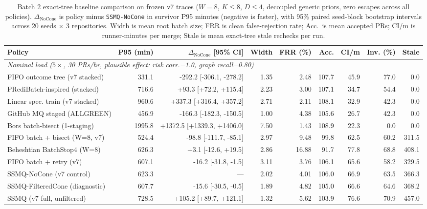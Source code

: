 \begin{table}[t]\centering\scriptsize
\caption{Batch 2 exact-tree baseline comparison on frozen v7 traces ($W{=}8$, $K{\le}8$, $D{\le}4$, decoupled generic priors, zero escapes across all policies). $\Delta_{\text{NoCone}}$ is policy minus \texttt{SSMQ-NoCone} in survivor P95 minutes (negative is faster), with 95\% paired seed-block bootstrap intervals across 20 seeds $\times$ 3 repositories. Width is mean root batch size; FRR is clean false-rejection rate; Acc.\ is mean accepted PRs; CI/m is runner-minutes per merge; Stale is mean exact-tree stale rechecks per run.}\label{tab:v8baselines}
\begin{tabular}{lrrrrrrrr}\toprule
Policy & P95 (min) & $\Delta_{\text{NoCone}}$ [95\% CI] & Width & FRR (\%) & Acc. & CI/m & Inv. (\%) & Stale \\ \midrule
\multicolumn{9}{l}{\textit{Nominal load ($5\times$, 30 PRs/hr, plausible effect: risk corr.=1.0, graph recall=0.80)}} \\
FIFO outcome tree (v7 stacked) & 331.1 & -292.2 [-306.1, -278.2] & 1.35 & 2.48 & 107.7 & 45.9 & 77.0 & 0.0 \\
PRediBatch-inspired (stacked) & 716.6 & +93.3 [+72.2, +115.4] & 2.23 & 3.00 & 107.1 & 34.7 & 54.4 & 0.0 \\
Linear spec. train (v7 stacked) & 960.6 & +337.3 [+316.4, +357.2] & 2.71 & 2.11 & 108.1 & 32.9 & 42.3 & 0.0 \\
GitHub MQ staged (ALLGREEN) & 456.9 & -166.3 [-182.3, -150.5] & 1.00 & 4.38 & 105.6 & 26.7 & 42.3 & 0.0 \\
Bors batch-bisect (1-staging) & 1995.8 & +1372.5 [+1339.3, +1406.0] & 7.50 & 1.43 & 108.9 & 22.3 & 0.0 & 0.0 \\
FIFO batch + bisect (W=8, v7) & 524.4 & -98.8 [-111.7, -85.1] & 2.97 & 9.48 & 99.8 & 62.5 & 60.2 & 311.5 \\
Beheshtian BatchStop4 (W=8) & 626.3 & +3.1 [-12.6, +19.5] & 2.86 & 16.88 & 91.7 & 77.8 & 68.8 & 408.1 \\
FIFO batch + retry (v7) & 607.1 & -16.2 [-31.8, -1.5] & 3.11 & 3.76 & 106.1 & 65.6 & 58.2 & 329.5 \\
SSMQ-NoCone (v7 control) & 623.3 & --- & 2.02 & 4.01 & 106.0 & 66.9 & 63.5 & 366.3 \\
SSMQ-FilteredCone (diagnostic) & 607.7 & -15.6 [-30.5, -0.5] & 1.89 & 4.82 & 105.0 & 66.6 & 64.6 & 368.2 \\
SSMQ (v7 full, unfiltered) & 728.5 & +105.2 [+89.7, +121.1] & 1.32 & 5.62 & 103.9 & 76.6 & 70.9 & 457.0 \\

\end{tabular}
\end{table}
